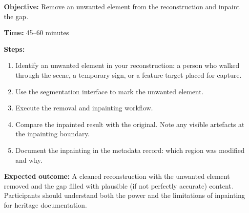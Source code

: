 \begin{tcolorbox}[
  enhanced,
  colback=SuccessGreen!8,
  colframe=SuccessGreen,
  fonttitle=\bfseries\sffamily,
  title={Exercise 4.2: Scene Cleanup},
  sharp corners=south,
  boxrule=0.6pt
]
\textbf{Objective:} Remove an unwanted element from the reconstruction and inpaint the gap.

\textbf{Time:} 45--60 minutes

\textbf{Steps:}
\begin{enumerate}
  \item Identify an unwanted element in your reconstruction: a person who walked through the scene, a temporary sign, or a feature target placed for capture.
  \item Use the segmentation interface to mark the unwanted element.
  \item Execute the removal and inpainting workflow.
  \item Compare the inpainted result with the original. Note any visible artefacts at the inpainting boundary.
  \item Document the inpainting in the metadata record: which region was modified and why.
\end{enumerate}

\textbf{Expected outcome:} A cleaned reconstruction with the unwanted element removed and the gap filled with plausible (if not perfectly accurate) content. Participants should understand both the power and the limitations of inpainting for heritage documentation.
\end{tcolorbox}
